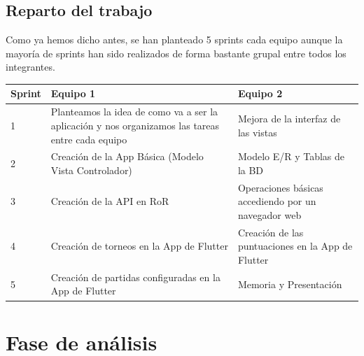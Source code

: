 \documentclass{article}
\begin{document}
\subsection{Reparto del trabajo}

Como ya hemos dicho antes, se han planteado 5 sprints cada equipo aunque la mayoría de sprints han sido realizados de forma bastante grupal entre todos los integrantes.

\begin{table}[H]
  \begin{center}
    \begin{tabularx}{\linewidth}{|X|X|X|} %
      \hline
      \textbf{Sprint} & \textbf{Equipo 1} & \textbf{Equipo 2}\\
      \hline
      1 & Planteamos la idea de como va a ser la aplicación y nos organizamos las tareas entre cada equipo & Mejora de la interfaz de las vistas \\
      \hline
      2 & Creación de la App Básica (Modelo Vista Controlador) & Modelo E/R y Tablas de la BD\\
      \hline
      3 & Creación de la API en RoR & Operaciones básicas accediendo por un navegador web\\
      \hline
      4 & Creación de torneos en la App de Flutter & Creación de las puntuaciones en la App de Flutter\\
      \hline
      5 & Creación de partidas configuradas en la App de Flutter & Memoria y Presentación\\
      \hline
    \end{tabularx}
  \end{center}
\end{table}

\section{Fase de análisis}
\end{document}
